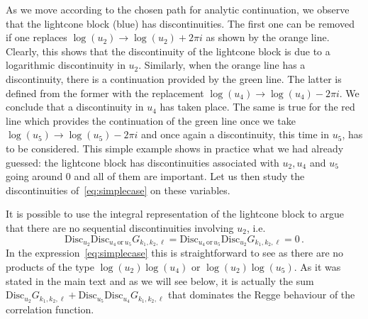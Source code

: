 As we move according to the chosen path for analytic continuation, we observe that the lightcone block (blue) has discontinuities. The first one can be removed if one replaces $\log(u_2) \to \log(u_2)+ 2\pi i$ as shown by the orange line. Clearly, this shows that the discontinuity of the lightcone block is due to a logarithmic discontinuity in $u_2$. Similarly, when the orange line has a discontinuity, there is a continuation provided by the green line. The latter is defined from the former with the replacement $\log(u_4)\to \log(u_4)-2\pi i$. We conclude that a discontinuity in $u_4$ has taken place. The same is true for the red line which provides the continuation of the green line once we take $\log(u_5)\to \log(u_5)-2\pi i$ and once again a discontinuity, this time in $u_5$, has to be considered. This simple example shows in practice what we had already guessed: the lightcone block has discontinuities associated with $u_2, u_4$ and $u_5$ going around 0 and all of them are important. Let us then study the discontinuities of~\eqref{eq:simplecase} on these variables.

It is possible to use the integral representation of the lightcone block to argue that there are no sequential discontinuities involving $u_2$, i.e.
\begin{equation}
  \text{Disc}_{u_2} \text{Disc}_{u_4\, \text{or}\, u_5}G_{k_1,k_2, \ell} =\text{Disc}_{u_4\, \text{or}\, u_5}\text{Disc}_{u_2}  G_{k_1,k_2, \ell}=0\,.
\end{equation}
In the expression~\eqref{eq:simplecase} this is straightforward to see as there are no products of the type $\log(u_2)\log(u_4)$ or $\log(u_2)\log(u_5)$. As it was stated in the main text and as we will see below, it is actually the sum  $\text{Disc}_{u_2}  G_{k_1,k_2, \ell}+ \text{Disc}_{u_5}\text{Disc}_{u_4} G_{k_1,k_2,\ell}$ that dominates the Regge behaviour of the correlation function.

